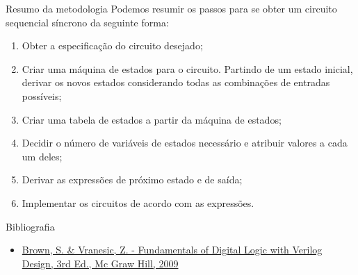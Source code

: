 \begin{frame}{Resumo da metodologia} 
    Podemos resumir os passos para se obter um circuito sequencial síncrono da seguinte forma:
    \begin{enumerate}
        \item Obter a especificação do circuito desejado;
        \item Criar uma máquina de estados para o circuito. Partindo de um estado inicial, derivar os novos estados considerando todas as combinações de entradas possíveis; 
        \item Criar uma tabela de estados a partir da máquina de estados;
        \item Decidir o número de variáveis de estados necessário e atribuir valores a cada um deles; 
        \item Derivar as expressões de próximo estado e de saída; 
        \item Implementar os circuitos de acordo com as expressões. 
    \end{enumerate}
\end{frame}

\begin{frame}{Bibliografia} 
	\begin{itemize}
		\item \href{https://www.google.com.br/search?q=filetype\%3Apdf+Fundamentals+of+Digital+Logic+with+Verilog+Design+&oq=filetype\%3Apdf}{Brown, S. \& Vranesic, Z. - Fundamentals of Digital Logic with Verilog Design, 3rd Ed., Mc Graw Hill, 2009}
	\end{itemize}
\end{frame}

\begin{frame}
	\titlepage
\end{frame} 

